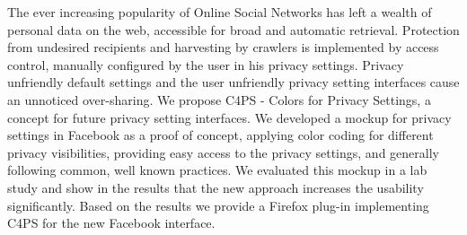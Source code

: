 \documentclass[a4paper,12pt,svgnames]{report}
\begin{document}
\begin{itemize}
The ever increasing popularity of Online Social Networks has left a wealth of
personal data on the web, accessible for broad and automatic retrieval.
Protection from undesired recipients and harvesting by crawlers is implemented
by access control, manually configured by the user in his privacy settings.
Privacy unfriendly default settings and the user unfriendly privacy setting
interfaces cause an unnoticed over-sharing. We propose C4PS - Colors for Privacy
Settings, a concept for future privacy setting interfaces. We developed a mockup
for privacy settings in Facebook as a proof of concept, applying color coding
for different privacy visibilities, providing easy access to the privacy
settings, and generally following common, well known practices. We evaluated
this mockup in a lab study and show in the results that the new approach
increases the usability significantly. Based on the results we provide a Firefox
plug-in implementing C4PS for the new Facebook interface.
\end{itemize}
\end{document}
